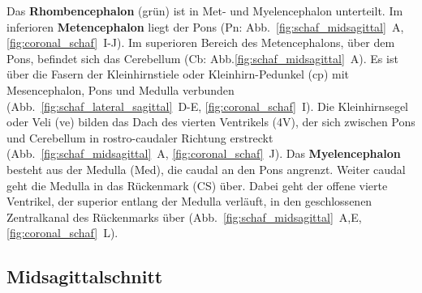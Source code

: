 \documentclass[12pt,a4paper,pdftex]{article}
\begin{document}
\noindent Das \textbf{Rhombencephalon} (grün) ist in Met- und Myelencephalon unterteilt. Im inferioren \textbf{Metencephalon} liegt der Pons (Pn: Abb.~\ref{fig:schaf_midsagittal}~A, \ref{fig:coronal_schaf}~I-J). Im superioren Bereich des Metencephalons, über dem Pons, befindet sich das Cerebellum (Cb: Abb.\ref{fig:schaf_midsagittal}~A). Es ist über die Fasern der Kleinhirnstiele oder Kleinhirn-Pedunkel (cp) mit Mesencephalon, Pons und Medulla verbunden (Abb.~\ref{fig:schaf_lateral_sagittal}~D-E, \ref{fig:coronal_schaf}~I). Die Kleinhirnsegel oder Veli (ve) bilden das Dach des vierten Ventrikels (4V), der sich zwischen Pons und Cerebellum in rostro-caudaler Richtung erstreckt (Abb.~\ref{fig:schaf_midsagittal}~A, \ref{fig:coronal_schaf}~J). Das \textbf{Myelencephalon} besteht aus der Medulla (Med), die caudal an den Pons angrenzt. Weiter caudal geht die Medulla in das Rückenmark (CS) über. Dabei geht der offene vierte Ventrikel, der superior entlang der Medulla verläuft, in den geschlossenen Zentralkanal des Rückenmarks über (Abb.~\ref{fig:schaf_midsagittal}~A,E, \ref{fig:coronal_schaf}~L).



\newpage
\subsection{Midsagittalschnitt}
\label{subsec:midsagittal}
\end{document}
